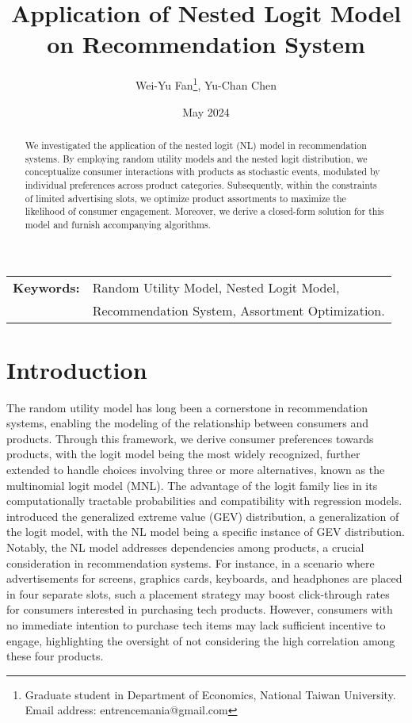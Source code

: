 \documentclass[12pt]{article}
\title{Application of Nested Logit Model on Recommendation System}
\author{Wei-Yu Fan\thanks{
Graduate student in Department of Economics, National Taiwan University.\\ 
Email address: entrencemania@gmail.com
}, Yu-Chan Chen
}
\date{May 2024}
\theoremstyle{definition}
\begin{document}
\maketitle
\begin{sloppypar}
\begin{spacing}{0}
\begin{abstract}
\noindent 
We investigated the application of the nested logit (NL) model in recommendation systems. By employing random utility models and the nested logit distribution, we conceptualize consumer interactions with products as stochastic events, modulated by individual preferences across product categories. Subsequently, within the constraints of limited advertising slots, we optimize product assortments to maximize the likelihood of consumer engagement. Moreover, we derive a closed-form solution for this model and furnish accompanying algorithms.
\end{abstract}
\end{spacing}
\begin{tabular}{rl}
\\
\textbf{Keywords:} &Random Utility Model, Nested Logit Model, \\
&Recommendation System, Assortment Optimization.\\
\end{tabular}

\newpage
\section{Introduction}
The random utility model has long been a cornerstone in recommendation systems, enabling the modeling of the relationship between consumers and products. Through this framework, we derive consumer preferences towards products, with the logit model being the most widely recognized, further extended to handle choices involving three or more alternatives, known as the multinomial logit model (MNL). The advantage of the logit family lies in its computationally tractable probabilities and compatibility with regression models. \textcite{mcfadden1977} introduced the generalized extreme value (GEV) distribution, a generalization of the logit model, with the NL model being a specific instance of GEV distribution. Notably, the NL model addresses dependencies among products, a crucial consideration in recommendation systems. For instance, in a scenario where advertisements for screens, graphics cards, keyboards, and headphones are placed in four separate slots, such a placement strategy may boost click-through rates for consumers interested in purchasing tech products. However, consumers with no immediate intention to purchase tech items may lack sufficient incentive to engage, highlighting the oversight of not considering the high correlation among these four products.


\end{sloppypar}
\end{document}
